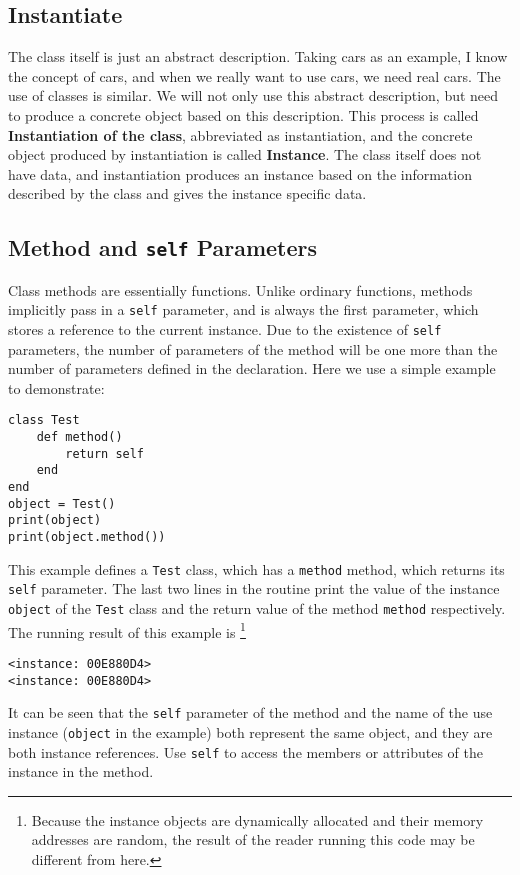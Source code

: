 \subsection {Instantiate}

The class itself is just an abstract description. Taking cars as an example, I know the concept of cars, and when we really want to use cars, we need real cars. The use of classes is similar. We will not only use this abstract description, but need to produce a concrete object based on this description. This process is called \textbf{Instantiation of the class}, abbreviated as instantiation, and the concrete object produced by instantiation is called \textbf{Instance}. The class itself does not have data, and instantiation produces an instance based on the information described by the class and gives the instance specific data.

\subsection {Method and \texttt{self} Parameters}

Class methods are essentially functions. Unlike ordinary functions, methods implicitly pass in a \texttt{self} parameter, and  is always the first parameter, which stores a reference to the current instance. Due to the existence of \texttt{self} parameters, the number of parameters of the method will be one more than the number of parameters defined in the declaration. Here we use a simple example to demonstrate:
\begin{lstlisting}[language=berry, numbers=none]
class Test
    def method()
        return self
    end
end
object = Test()
print(object)
print(object.method())
\end{lstlisting}
This example defines a \texttt{Test} class, which has a \texttt{method} method, which returns its \texttt{self} parameter. The last two lines in the routine print the value of the instance \texttt{object} of the \texttt{Test} class and the return value of the method \texttt{method} respectively. The running result of this example is \footnote{Because the instance objects are dynamically allocated and their memory addresses are random, the result of the reader running this code may be different from here. }
\begin{lstlisting}[numbers=none]
<instance: 00E880D4>
<instance: 00E880D4>
\end{lstlisting}
It can be seen that the \texttt{self} parameter of the method and the name of the use instance (\texttt{object} in the example) both represent the same object, and they are both instance references. Use \texttt{self} to access the members or attributes of the instance in the method.

